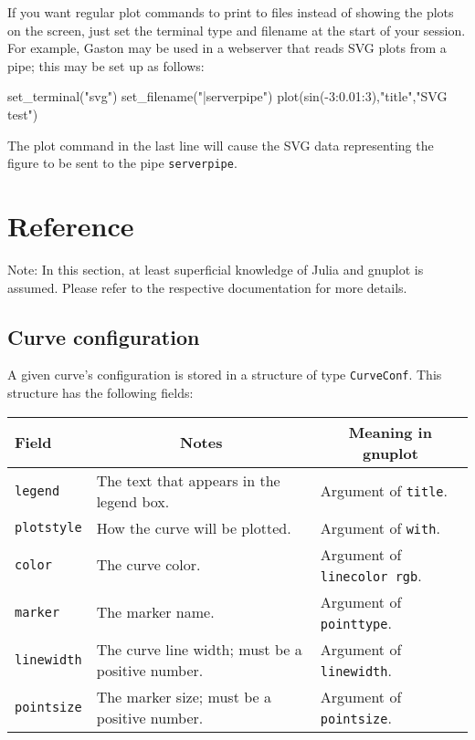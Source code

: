 \documentclass[11pt]{article}
\newcommand{\cmd}[1]{\texttt{#1}}
\begin{document}
If you want regular plot commands to print to files instead of showing the
plots on the screen, just set the terminal type and filename at the start of
your session. For example, Gaston may be used in a webserver that reads SVG
plots from a pipe; this may be set up as follows:
\begin{juliacode}
set_terminal("svg")
set_filename("|serverpipe")
plot(sin(-3:0.01:3),"title","SVG test")
\end{juliacode}
The plot command in the last line will cause the SVG data representing the
figure to be sent to the pipe \cmd{serverpipe}.

\section{Reference}
\label{refer}

Note: In this section, at least superficial knowledge of Julia and gnuplot is
assumed. Please refer to the respective documentation for more details.

\subsection{Curve configuration}

A given curve's configuration is stored in a structure of type \cmd{CurveConf}.
This structure has the following fields:

{\small
\begin{center}
\begin{tabular}{lll}
	\toprule
	\textbf{Field} & \multicolumn{1}{c}{\textbf{Notes}} &
	\multicolumn{1}{c}{\textbf{Meaning in gnuplot}} \\
	\midrule
	\cmd{legend} & The text that appears in the legend box. & Argument of
	\cmd{title}. \\
	\cmd{plotstyle} & How the curve will be plotted. & Argument of \cmd{with}.
	\\
	\cmd{color} & The curve color. & Argument of \cmd{linecolor rgb}. \\
	\cmd{marker} & The marker name. & Argument of \cmd{pointtype}. \\
	\cmd{linewidth} & The curve line width; must be a positive number. &
	Argument of \cmd{linewidth}. \\
	\cmd{pointsize} & The marker size; must be a positive number. & Argument
	of \cmd{pointsize}. \\
	\bottomrule
\end{tabular}
\end{center}}
\end{document}
